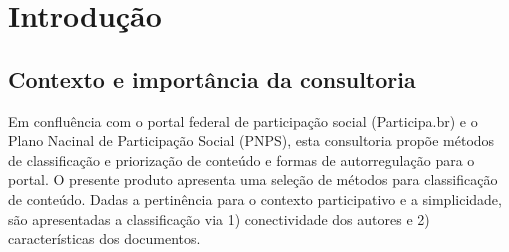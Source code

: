 \documentclass[12pt]{article}
\newcommand{\PalavrasChave}{reconhecimento de padrões, redes complexas, processamento de linguagem natural, participação social}
\begin{document}



\tableofcontents
\newpage


\begin{abstract}
Este documento descreve rotinas de priorização de conteúdo e de autorregulação para o portal federal de participação social.\\

{\bf Palavras-chave:} \PalavrasChave.
\end{abstract}
\newpage

\section{Introdução}
\subsection{Contexto e importância da consultoria}
Em confluência com o portal federal de participação social (Participa.br) e o Plano Nacinal de Participação Social (PNPS), esta consultoria propõe métodos de classificação e priorização de conteúdo e formas de autorregulação para o portal. O presente produto apresenta uma seleção de métodos para classificação de conteúdo. Dadas a pertinência para o contexto participativo e a simplicidade, são apresentadas a classificação via 1) conectividade dos autores e 2) características dos documentos.
\end{document}
